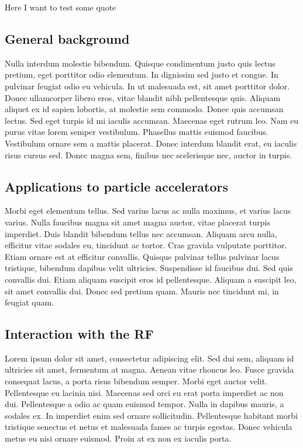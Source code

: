 Here I want to test\cite{einstein} some\cite{latexcompanion} quote\cite{knuthwebsite}

\subsection[General background]{General background}
Nulla interdum molestie bibendum. Quisque condimentum justo quis lectus pretium, eget porttitor odio elementum. In dignissim sed justo et congue. In pulvinar feugiat odio eu vehicula. In ut malesuada est, sit amet porttitor dolor. Donec ullamcorper libero eros, vitae blandit nibh pellentesque quis. Aliquam aliquet ex id sapien lobortis, at molestie sem commodo. Donec quis accumsan lectus. Sed eget turpis id mi iaculis accumsan. Maecenas eget rutrum leo. Nam eu purus vitae lorem semper vestibulum. Phasellus mattis euismod faucibus. Vestibulum ornare sem a mattis placerat. Donec interdum blandit erat, eu iaculis risus cursus sed. Donec magna sem, finibus nec scelerisque nec, auctor in turpis.

\subsection[Applications to particle accelerators]{Applications to particle accelerators}

Morbi eget elementum tellus. Sed varius lacus ac nulla maximus, et varius lacus varius. Nulla faucibus magna sit amet magna auctor, vitae placerat turpis imperdiet. Duis blandit bibendum tellus nec accumsan. Aliquam arcu nulla, efficitur vitae sodales eu, tincidunt ac tortor. Cras gravida vulputate porttitor. Etiam ornare est at efficitur convallis. Quisque pulvinar tellus pulvinar lacus tristique, bibendum dapibus velit ultricies. Suspendisse id faucibus dui. Sed quis convallis dui. Etiam aliquam suscipit eros id pellentesque. Aliquam a suscipit leo, sit amet convallis dui. Donec sed pretium quam. Mauris nec tincidunt mi, in feugiat quam.

\subsection[Interaction with the RF]{Interaction with the RF}

Lorem ipsum dolor sit amet, consectetur adipiscing elit. Sed dui sem, aliquam id ultricies sit amet, fermentum at magna. Aenean vitae rhoncus leo. Fusce gravida consequat lacus, a porta risus bibendum semper. Morbi eget auctor velit. Pellentesque eu lacinia nisi. Maecenas sed orci eu erat porta imperdiet ac non dui. Pellentesque a odio ac quam euismod tempor. Nulla in dapibus mauris, a sodales ex. In imperdiet enim sed ornare sollicitudin. Pellentesque habitant morbi tristique senectus et netus et malesuada fames ac turpis egestas. Donec vehicula metus eu nisi ornare euismod. Proin at ex non ex iaculis porta.




